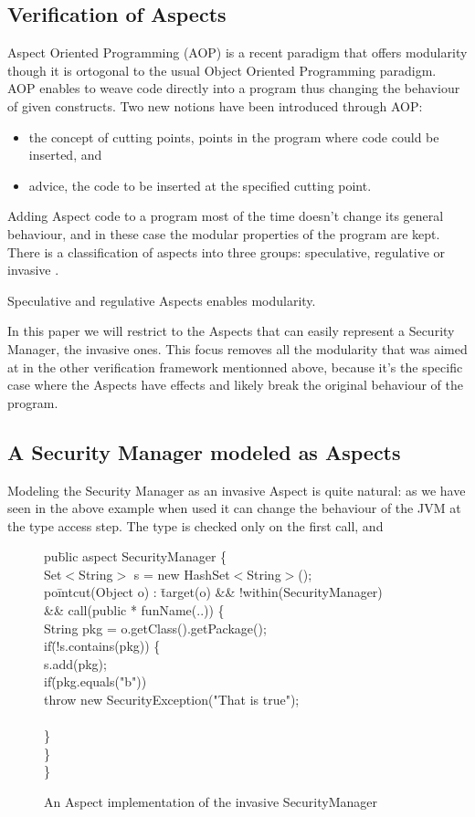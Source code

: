 \documentclass[draft]{llncs}
\begin{document}
\subsection{Verification of Aspects}
Aspect Oriented Programming (AOP) is a recent paradigm that offers modularity though it is ortogonal to 
the usual Object Oriented Programming paradigm. AOP enables to weave code directly into a program
thus changing the behaviour of given constructs. Two new notions have been introduced through AOP:
\begin{itemize}
\item the concept of cutting points, points in the program where code could be inserted, and
\item advice, the code to be inserted at the specified cutting point.
\end{itemize}
Adding Aspect code to a program most of the time doesn't change its general behaviour, and in these case
the modular properties of the program are kept.
There is a classification of aspects into three groups: speculative, regulative or invasive .

Speculative and regulative Aspects enables modularity. 


In this paper we will restrict to the Aspects that can easily represent a Security Manager, the invasive
ones. This focus removes all the modularity that was aimed at in the other verification framework
mentionned above,
because it's the specific case where the Aspects have effects and likely break the original behaviour of
the program.

\subsection{A Security Manager modeled as Aspects}
Modeling the Security Manager as an invasive Aspect is quite natural: as we have seen in the above example 
when used it can change the behaviour of the JVM at the type access step. The type is checked only on the
first call, and
%
\begin{figure}
\bcode
pu\=blic aspect SecurityManager \{\+\\

Set$<$String$>$ s = new HashSet$<$String$>$();\\
po\=intcut(Object o) : \=target(o) \&\& !within(SecurityManager)\+ \\
           \>\&\& call(public * funName(..)) \{\\
    String pkg = o.getClass().getPackage();\\
    if\=(!s.contains(pkg)) \{\+\\     
       s.add(pkg);\\
       if\=(pkg.equals("b"))\\
           \>throw new SecurityException("That is true");\\\-\\ 
    \}\-\\
\}\-\\
\}
\ecode
\caption{An Aspect implementation of the invasive SecurityManager}
\end{figure}
\end{document}
